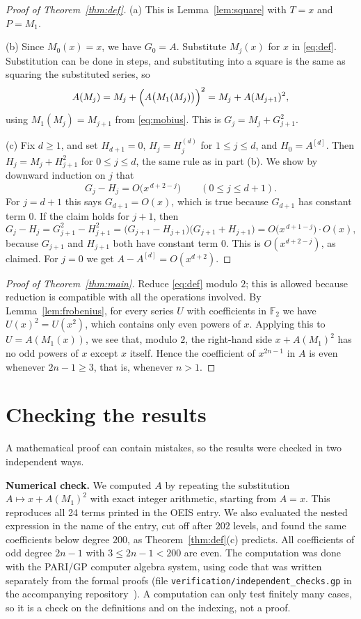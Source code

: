 \documentclass[11pt,a4paper]{article}
\theoremstyle{definition}
\theoremstyle{remark}
\newcommand{\F}{\mathbb{F}}
\newcommand{\para}[1]{\par\medskip\noindent\textbf{#1}\enspace}
\begin{document}
\begin{proof}[Proof of Theorem~\ref{thm:def}]
(a) This is Lemma~\ref{lem:square} with $T=x$ and $P=M_1$.

(b) Since $M_0(x)=x$, we have $G_0=A$. Substitute $M_j(x)$ for $x$ in \eqref{eq:def}. Substitution can be done in steps,
and substituting into a square is the same as squaring the substituted series, so
\[
A(M_j)=M_j+\Bigl(A\bigl(M_1(M_j)\bigr)\Bigr)^2=M_j+A(M_{j+1})^2,
\]
using $M_1(M_j)=M_{j+1}$ from \eqref{eq:mobius}. This is $G_j=M_j+G_{j+1}^2$.

(c) Fix $d\ge1$, and set $H_{d+1}=0$, $H_j=H^{(d)}_j$ for $1\le j\le d$, and $H_0=A^{[d]}$. Then
$H_j=M_j+H_{j+1}^2$ for $0\le j\le d$, the same rule as in part (b). We show by downward induction on $j$ that
\[
G_j-H_j=O\bigl(x^{\,d+2-j}\bigr)\qquad(0\le j\le d+1).
\]
For $j=d+1$ this says $G_{d+1}=O(x)$, which is true because $G_{d+1}$ has constant term $0$. If the claim holds for
$j+1$, then
\[
G_j-H_j=G_{j+1}^2-H_{j+1}^2=\bigl(G_{j+1}-H_{j+1}\bigr)\bigl(G_{j+1}+H_{j+1}\bigr)=O\bigl(x^{\,d+1-j}\bigr)\cdot O(x),
\]
because $G_{j+1}$ and $H_{j+1}$ both have constant term $0$. This is $O(x^{d+2-j})$, as claimed. For $j=0$ we get
$A-A^{[d]}=O(x^{d+2})$.
\end{proof}

\begin{proof}[Proof of Theorem~\ref{thm:main}]
Reduce \eqref{eq:def} modulo $2$; this is allowed because reduction is compatible with all the operations involved. By
Lemma~\ref{lem:frobenius}, for every series $U$ with coefficients in $\F_2$ we have $U(x)^2=U(x^2)$, which contains only
even powers of $x$. Applying this to $U=A(M_1(x))$, we see that, modulo $2$, the right-hand side $x+A(M_1)^2$ has no odd
powers of $x$ except $x$ itself. Hence the coefficient of $x^{2n-1}$ in $A$ is even whenever $2n-1\ge3$, that is,
whenever $n>1$.
\end{proof}

\section{Checking the results}\label{sec:checks}

A mathematical proof can contain mistakes, so the results were checked in two independent ways.

\para{Numerical check.}
We computed $A$ by repeating the substitution $A\mapsto x+A(M_1)^2$ with exact integer arithmetic, starting
from $A=x$. This reproduces all 24 terms printed in the OEIS entry. We also evaluated the nested expression in the name of the entry,
cut off after $202$ levels, and found the same coefficients below degree $200$, as Theorem~\ref{thm:def}(c) predicts.
All coefficients of odd degree $2n-1$ with $3\le2n-1<200$ are even.
The computation was done with the PARI/GP computer algebra system, using code that was written separately from the
formal proofs (file \texttt{verification/independent\_checks.gp} in the accompanying repository~\cite{repo}).
A computation can only test finitely many cases, so it is a check on the definitions and on the indexing, not a proof.
\end{document}
